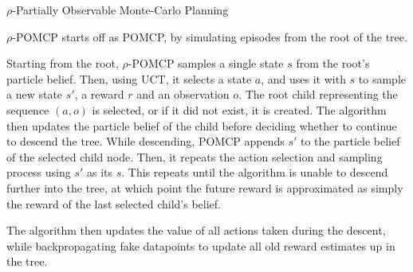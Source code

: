 \begin{algorithm}[H]
    \caption{$\rho$-Partially Observable Monte-Carlo Planning}
\begin{multicols}{2}


    \setcounter{AlgoLine}{0}
\end{multicols}
\end{algorithm}

$\rho$-POMCP starts off as POMCP, by simulating episodes from the root of the tree.

Starting from the root, $\rho$-POMCP samples a single state $s$ from the root's particle belief.
Then, using UCT, it selects a state $a$, and uses it with $s$ to sample a new state $s'$, a reward
$r$ and an observation $o$. The root child representing the sequence $(a,o)$ is selected, or if it
did not exist, it is created. The algorithm then updates the particle belief of the child before
deciding whether to continue to descend the tree. While descending, POMCP appends $s'$ to the
particle belief of the selected child node. Then, it repeats the action selection and sampling
process using $s'$ as its $s$. This repeats until the algorithm is unable to descend further into
the tree, at which point the future reward is approximated as simply the reward of the last
selected child's belief.

The algorithm then updates the value of all actions taken during the descent, while backpropagating
fake datapoints to update all old reward estimates up in the tree.

